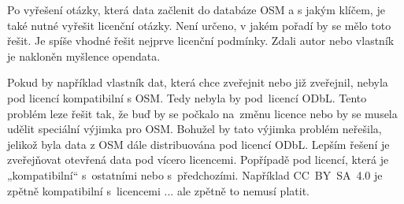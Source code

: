 Po vyřešení otázky, která data začlenit do databáze OSM a s jakým 
klíčem, je také nutné vyřešit licenční otázky. Není určeno, v jakém 
pořadí by se mělo toto řešit. Je spíše vhodné řešit nejprve licenční podmínky. 
Zdali autor nebo vlastník je nakloněn myšlence opendata.  

Pokud by například vlastník dat, která chce zveřejnit nebo již 
zveřejnil, nebyla pod licencí kompatibilní s OSM. Tedy nebyla by 
pod~licencí ODbL. Tento problém leze řešit tak, že buď by se počkalo
na~změnu licence nebo by se musela udělit speciální výjimka pro OSM.
Bohužel by tato výjimka  problém neřešila, jelikož byla data z OSM dále
distribuována pod licencí ODbL. Lepším řešení je zveřejňovat otevřená
data pod vícero licencemi. Popřípadě pod licencí, která je „kompatibilní“ 
s~ostatními nebo s~předchozími. Například CC­~BY~SA~4.0 je zpětně kompatibilní 
s~licencemi ...   ale zpětně to nemusí platit.  

